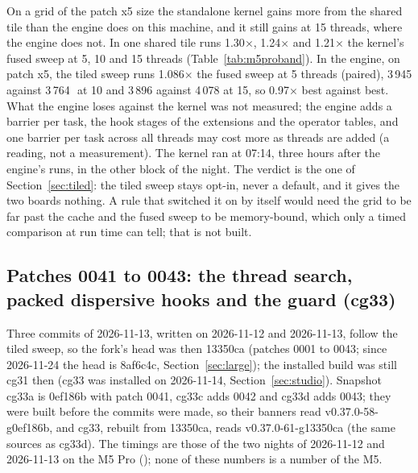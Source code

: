 On a grid of the patch x5 size the standalone kernel gains more from the shared tile than the engine does on this
machine, and it still gains at 15 threads, where the engine does not. In  one shared tile runs 1.30$\times$, 1.24$\times$ and 1.21$\times$ the kernel's fused sweep at 5, 10 and 15 threads
(Table~\ref{tab:m5proband}). In the engine, on patch x5, the tiled sweep runs 1.086$\times$ the fused sweep at 5
threads (paired), 3\,945 against 3\,764\,\MC\ at 10 and 3\,896 against 4\,078 at 15, so 0.97$\times$ best against best.
What the engine loses against the kernel was not measured; the engine adds a barrier per task, the hook stages of the
extensions and the operator tables, and one barrier per task across all threads may cost more as threads are added
(a reading, not a measurement). The kernel ran at 07:14, three hours after the engine's runs, in the other block of
the night. The
verdict is the one of Section~\ref{sec:tiled}: the tiled sweep stays opt-in, never a default, and it gives the two
boards nothing. A rule that switched it on by itself would need the grid to be far past the cache and the fused sweep
to be memory-bound, which only a timed comparison at run time can tell; that is not built.

\subsection{Patches 0041 to 0043: the thread search, packed dispersive hooks and the guard (cg33)}\label{sec:cg33}
Three commits of 2026-11-13, written on 2026-11-12 and 2026-11-13, follow the tiled sweep, so the fork's head was then 13350ca (patches 0001 to
0043; since 2026-11-24 the head is 8af6c4c, Section~\ref{sec:large}); the installed build was still cg31 then (cg33 was installed on 2026-11-14, Section~\ref{sec:studio}). Snapshot cg33a is 0ef186b with patch 0041, cg33c adds 0042 and cg33d adds 0043;
they were built before the commits were made, so their banners read v0.37.0-58-g0ef186b, and cg33, rebuilt from 13350ca,
reads v0.37.0-61-g13350ca (the same sources as cg33d). The timings are those of the two nights of 2026-11-12 and
2026-11-13 on the M5 Pro (); none of these numbers is a number of the M5.

